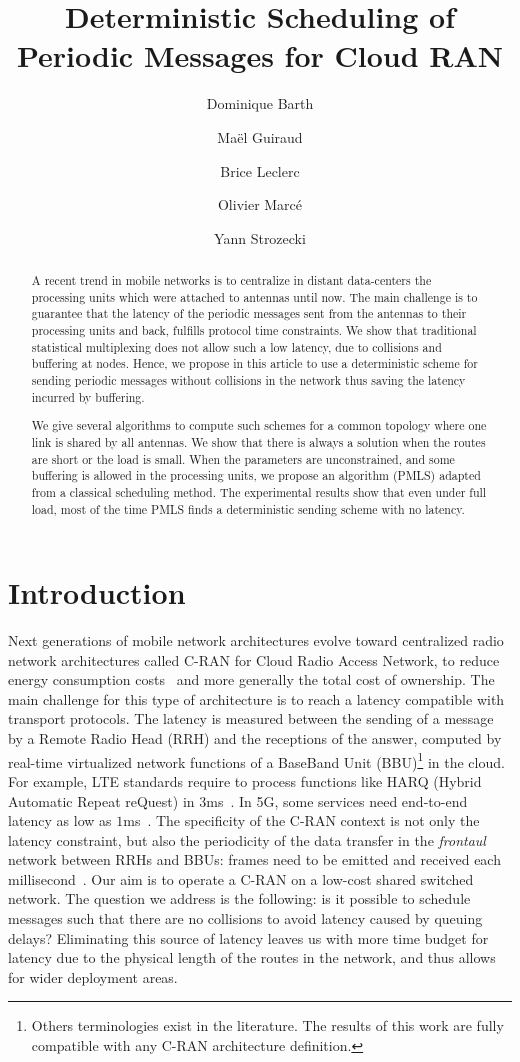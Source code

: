 \documentclass[10pt, conference, letterpaper]{IEEEtran}
\title{Deterministic Scheduling of Periodic Messages for Cloud RAN}
\author[1]{Dominique Barth}
\author[1]{Ma\"el Guiraud}
\author[2]{Brice Leclerc}
\author[2]{Olivier Marc\'e}
\author[1]{Yann Strozecki}
\affil[1]{David Laboratory, UVSQ}
\affil[2]{Nokia Bell Labs France}
\begin{document}
\maketitle

\begin{abstract}
A recent trend in mobile networks is to centralize in distant data-centers the processing units which were attached to 
antennas until now. The main challenge is to guarantee that the latency of the periodic messages sent from the antennas to their processing
units and back, fulfills protocol time constraints. We show that traditional statistical multiplexing does not allow such a low latency, due to collisions and buffering at nodes. Hence, we propose in this article to use a deterministic scheme for sending periodic messages without collisions in the network thus saving the latency incurred by buffering.

We give several algorithms to compute such schemes for a common topology where one link is shared by all antennas.
We show that there is always a solution when the routes are short or the load is small. When the parameters are unconstrained,
and some buffering is allowed in the processing units, we propose an algorithm (PMLS) adapted from a classical scheduling method.
The experimental results show that even under full load, most of the time PMLS finds a deterministic sending scheme with no latency.
\end{abstract}


\section{Introduction}

Next generations of mobile network architectures evolve toward centralized radio network architectures called C-RAN for Cloud Radio Access Network, to reduce energy consumption costs~\cite{mobile2011c} and more generally the total cost of ownership. The main challenge for this type of architecture is to reach a latency compatible with transport protocols. The latency is measured between the sending of a message by a Remote Radio Head (RRH) and the receptions of the answer, computed by real-time virtualized network functions of a BaseBand Unit (BBU)\footnote{Others terminologies exist in the literature. The results of this work are fully compatible with any C-RAN architecture definition.} in the cloud. For example, LTE standards require to process functions like HARQ (Hybrid Automatic Repeat reQuest) in $3$ms~\cite{bouguen2012lte}. In 5G, some services need end-to-end latency as low as $1$ms~\cite{3gpp5g}. The specificity of the C-RAN context is not only the latency constraint, but also the periodicity of the data transfer in the \emph{frontaul} network between RRHs and BBUs: frames need to be emitted and received each millisecond~\cite{bouguen2012lte}.
Our aim is to operate a C-RAN on a low-cost shared switched network.
The question we address is the following: is it possible to schedule messages such that there are no collisions to avoid latency caused by queuing delays? 
Eliminating this source of latency leaves us with more time budget for latency due to the physical length of the routes in the network, and thus allows for wider deployment areas.
\end{document}
